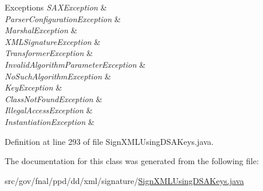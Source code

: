 \begin{DoxyExceptions}{Exceptions}
{\em S\-A\-X\-Exception} & \\
\hline
{\em Parser\-Configuration\-Exception} & \\
\hline
{\em Marshal\-Exception} & \\
\hline
{\em X\-M\-L\-Signature\-Exception} & \\
\hline
{\em Transformer\-Exception} & \\
\hline
{\em Invalid\-Algorithm\-Parameter\-Exception} & \\
\hline
{\em No\-Such\-Algorithm\-Exception} & \\
\hline
{\em Key\-Exception} & \\
\hline
{\em Class\-Not\-Found\-Exception} & \\
\hline
{\em Illegal\-Access\-Exception} & \\
\hline
{\em Instantiation\-Exception} & \\
\hline
\end{DoxyExceptions}


Definition at line 293 of file Sign\-X\-M\-L\-Using\-D\-S\-A\-Keys.\-java.



The documentation for this class was generated from the following file\-:\begin{DoxyCompactItemize}
\item 
src/gov/fnal/ppd/dd/xml/signature/\hyperlink{SignXMLUsingDSAKeys_8java}{Sign\-X\-M\-L\-Using\-D\-S\-A\-Keys.\-java}\end{DoxyCompactItemize}
